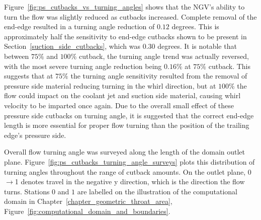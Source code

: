 \documentclass[a4paper, 11pt, oneside]{report}
\begin{document}
Figure~\ref{fig:ps_cutbacks_vs_turning_angles} shows that the NGV's ability to turn the flow was slightly reduced as cutbacks increased. Complete removal of the end-edge resulted in a turning angle reduction of $0.12$ degrees. This is approximately half the sensitivity to end-edge cutbacks shown to be present in Section~\ref{suction_side_cutbacks}, which was $0.30$ degrees. It is notable that between $75\%$ and $100\%$ cutback, the turning angle trend was actually reversed, with the most severe turning angle reduction being $0.16\%$ at $75\%$ cutback. This suggests that at $75\%$ the turning angle sensitivity resulted from the removal of pressure side material reducing turning in the whirl direction, but at $100\%$ the flow could impact on the coolant jet and suction side material, causing whirl velocity to be imparted once again. Due to the overall small effect of these pressure side cutbacks on turning angle, it is suggested that the correct end-edge length is more essential for proper flow turning than the position of the trailing edge's pressure side.

Overall flow turning angle was surveyed along the length of the domain outlet plane. Figure~\ref{fig:ps_cutbacks_turning_angle_surveys} plots this distribution of turning angles throughout the range of cutback amounts. On the outlet plane, 0$\rightarrow$1 denotes travel in the negative y direction, which is the direction the flow turns. Stations $0$ and $1$ are labelled on the illustration of the computational domain in Chapter~\ref{chapter_geometric_throat_area}, Figure~\ref{fig:computational_domain_and_boundaries}.
\end{document}
